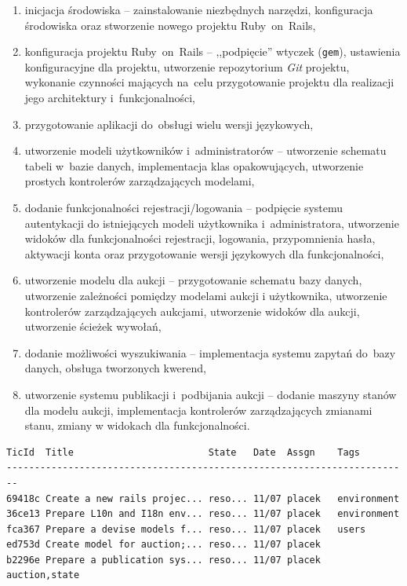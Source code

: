 \begin{enumerate}
  \item inicjacja środowiska -- zainstalowanie niezbędnych narzędzi, konfiguracja środowiska oraz stworzenie nowego projektu Ruby~on~Rails,
  \item konfiguracja projektu Ruby~on~Rails -- ,,podpięcie'' wtyczek (\texttt{gem}), ustawienia konfiguracyjne dla projektu, utworzenie repozytorium \textit{Git} projektu, wykonanie czynności mających na~celu przygotowanie projektu dla realizacji jego architektury i~funkcjonalności,
  \item przygotowanie aplikacji do~obsługi wielu wersji językowych,
  \item utworzenie modeli użytkowników i~administratorów -- utworzenie schematu tabeli w~bazie danych, implementacja klas opakowujących, utworzenie prostych kontrolerów zarządzających modelami,
  \item dodanie funkcjonalności rejestracji/logowania -- podpięcie systemu autentykacji do istniejących modeli użytkownika i~administratora, utworzenie widoków dla funkcjonalności rejestracji, logowania, przypomnienia hasła, aktywacji konta oraz przygotowanie wersji językowych dla funkcjonalności,
  \item utworzenie modelu dla aukcji -- przygotowanie schematu bazy danych, utworzenie zależności pomiędzy modelami aukcji i użytkownika, utworzenie kontrolerów zarządzających aukcjami, utworzenie widoków dla aukcji, utworzenie ścieżek wywołań,
  \item dodanie możliwości wyszukiwania -- implementacja systemu zapytań do~bazy danych, obsługa tworzonych kwerend,
  \item utworzenie systemu publikacji i~podbijania aukcji -- dodanie maszyny stanów dla modelu aukcji, implementacja kontrolerów zarządzających zmianami stanu, zmiany w widokach dla funkcjonalności.
\end{enumerate}

\begin{lstlisting}[label={code.log}]
TicId  Title                        State   Date  Assgn    Tags
------------------------------------------------------------------------
69418c Create a new rails projec... reso... 11/07 placek   environment
36ce13 Prepare L10n and I18n env... reso... 11/07 placek   environment
fca367 Prepare a devise models f... reso... 11/07 placek   users
ed753d Create model for auction;... reso... 11/07 placek
b2296e Prepare a publication sys... reso... 11/07 placek   auction,state
\end{lstlisting}
